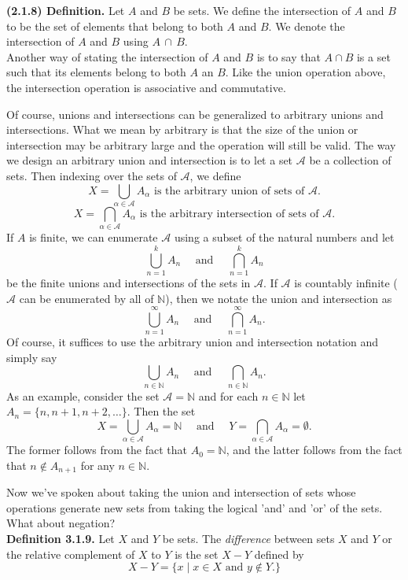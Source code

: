 \documentclass[12pt]{book}
\def\N{{\mathbb{N}}}
\begin{document}
\noindent\textbf{(2.1.8) Definition.} Let $A$ and $B$ be sets. We define the intersection of $A$ and $B$ to be the set of elements that belong to both $A$ and $B$. We denote the intersection of $A$ and $B$ using $A\,\cap\, B$.\\

Another way of stating the intersection of $A$ and $B$ is to say that $A\cap B$ is a set such that its elements belong to both $A$ an $B$. Like the union operation above, the intersection operation is associative and commutative.

Of course, unions and intersections can be generalized to arbitrary unions and intersections. What we mean by arbitrary is that the size of the union or intersection may be arbitrary large and the operation will still be valid. The way we design an arbitrary union and intersection is to let a set $\mathscr{A}$ be a collection of sets. Then indexing over the sets of $\mathscr{A}$, we define 
\[X=\bigcup_{\alpha\in\mathscr{A}} A_\alpha\text{ is the arbitrary union of sets of } \mathscr{A}.\]
\[X=\bigcap_{\alpha\in\mathscr{A}} A_\alpha\text{ is the arbitrary intersection of sets of } \mathscr{A}.\]
If $A$ is finite, we can enumerate $\mathscr{A}$ using a subset of the natural numbers and let 
\[\bigcup_{n=1}^k A_n\quad \text{ and } \quad \bigcap_{n=1}^k A_n\]
be the finite unions and intersections of the sets in $\mathscr{A}$. If $\mathscr{A}$ is countably infinite ($\mathscr{A}$ can be enumerated by all of $\N$), then we notate the union and intersection as 
\[\bigcup_{n=1}^\infty A_n\quad \text{ and } \quad \bigcap_{n=1}^\infty A_n.\]
Of course, it suffices to use the arbitrary union and intersection notation and simply say
\[\bigcup_{n\in\N} A_n\quad \text{ and } \quad \bigcap_{n\in\N} A_n.\]
As an example, consider the set $\mathscr{A}=\N$ and for each $n\in\N$ let $A_n=\{n,n+1,n+2,\ldots\}$. Then the set 
\[X=\bigcup_{\alpha\in\mathscr{A}} A_\alpha=\N\quad\text{ and }\quad Y=\bigcap_{\alpha\in\mathscr{A}} A_\alpha=\emptyset.\]
The former follows from the fact that $A_0=\N$, and the latter follows from the fact that $n\notin A_{n+1}$ for any $n\in\N$.\\

\bigskip

Now we've spoken about taking the union and intersection of sets whose operations generate new sets from taking the logical 'and' and 'or' of the sets. What about negation?\\ 

\noindent\textbf{Definition 3.1.9.} Let $X$ and $Y$ be sets. The \textit{difference} between sets $X$ and $Y$ or the relative complement of $X$ to $Y$ is the set $X-Y$ defined by
\[X-Y=\{x\mid x\in X \text{ and } y\notin Y.\}\]
\end{document}
